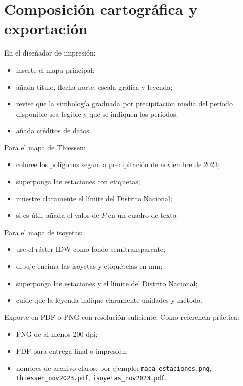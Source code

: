 \documentclass[11pt]{article}
\begin{document}
\section{Composición cartográfica y exportación}


En el diseñador de impresión:
\begin{itemize}
  \item inserte el mapa principal;
  \item añada título, flecha norte, escala gráfica y leyenda;
  \item revise que la simbología graduada por precipitación media del período
        disponible sea legible y que se indiquen los períodos;
  \item añada créditos de datos.
\end{itemize}


Para el mapa de Thiessen:
\begin{itemize}
  \item coloree los polígonos según la precipitación de noviembre de 2023;
  \item superponga las estaciones con etiquetas;
  \item muestre claramente el límite del Distrito Nacional;
  \item si es útil, añada el valor de $\bar{P}$ en un cuadro de texto.
\end{itemize}


Para el mapa de isoyetas:
\begin{itemize}
  \item use el ráster IDW como fondo semitransparente;
  \item dibuje encima las isoyetas y etiquételas en mm;
  \item superponga las estaciones y el límite del Distrito Nacional;
  \item cuide que la leyenda indique claramente unidades y método.
\end{itemize}


Exporte en PDF o PNG con resolución suficiente. Como referencia práctica:
\begin{itemize}
  \item PNG de al menos 200 dpi;
  \item PDF para entrega final o impresión;
  \item nombres de archivo claros, por ejemplo:
        \texttt{mapa\_estaciones.png},
        \texttt{thiessen\_nov2023.pdf},
        \texttt{isoyetas\_nov2023.pdf}.
\end{itemize}
\end{document}
